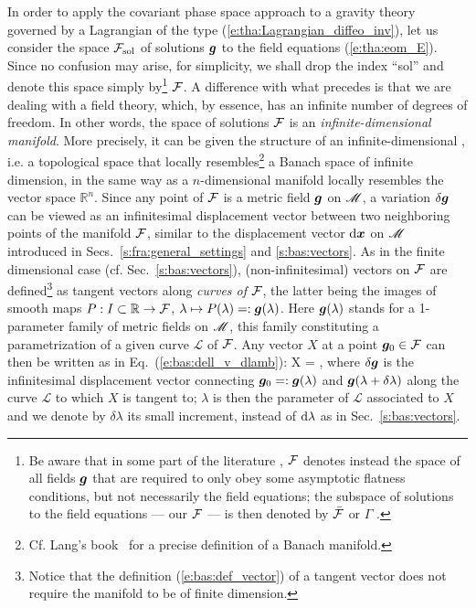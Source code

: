 In order to apply the covariant phase space approach to
a gravity theory governed by a Lagrangian of the type (\ref{e:tha:Lagrangian_diffeo_inv}),
let us consider the
space $\mathcal{F}_{\rm sol}$ of solutions $\bm{g}$ to the field equations
(\ref{e:tha:eom_E}). Since no confusion may arise, for simplicity,
we shall drop the index ``sol'' and denote this space simply by\footnote{Be aware that in
some part of the
literature \cite{AshteBR91,LeeW90,WaldZ00}, $\mathcal{F}$ denotes instead the space of all fields $\bm{g}$
that are required to only obey some asymptotic flatness conditions, but not necessarily the field equations;
the subspace of solutions to the field equations --- our $\mathcal{F}$ --- is then denoted
by $\bar{\mathcal{F}}$ \cite{LeeW90,WaldZ00} or $\Gamma$ \cite{AshteBR91}.} $\mathcal{F}$.
A difference with what precedes is that
we are dealing with a field theory, which, by essence, has
an infinite number of degrees of freedom. In other words,
the space of solutions $\mathcal{F}$ is
an \emph{infinite-dimensional manifold}. More precisely, it can be given the structure of an
infinite-dimensional 
\cite{LeeW90,HarloW20}, i.e. a topological space that locally resembles\footnote{Cf. Lang's book~\cite{Lang95} for a
precise definition of a Banach manifold.} a Banach space of infinite dimension, in the same
way as a $n$-dimensional manifold locally resembles the vector space $\mathbb{R}^n$.
Since any point of $\mathcal{F}$ is a metric field $\bm{g}$ on $\mathscr{M}$, a variation $\delta\bm{g}$
can be viewed as an infinitesimal displacement vector between two neighboring points of the manifold
$\mathcal{F}$, similar to the displacement vector $\mathrm{d}\bm{x}$ on $\mathscr{M}$ introduced in Secs.~\ref{s:fra:general_settings} and \ref{s:bas:vectors}.
As in the finite dimensional case
(cf. Sec.~\ref{s:bas:vectors}), (non-infinitesimal) vectors on $\mathcal{F}$
are defined\footnote{Notice that the definition (\ref{e:bas:def_vector}) of a tangent vector
does not require the manifold to be of finite dimension.} as tangent vectors
along \emph{curves of} $\mathcal{F}$, the latter being the images of smooth maps
$P: I\subset \mathbb{R} \to  \mathcal{F}$, $\lambda\mapsto P(\lambda) =: \bm{g}(\lambda)$. Here
$\bm{g}(\lambda)$ stands for a 1-parameter family of metric fields
on $\mathscr{M}$, this family constituting a parametrization of a given curve $\mathcal{L}$ of $\mathcal{F}$.
Any vector $X$ at a point $\bm{g}_0 \in \mathcal{F}$ can then be written as in Eq.~(\ref{e:bas:dell_v_dlamb}):
\be \label{e:tha:X_dg/dlambda}
    X =  ,
\ee
where $\delta\bm{g}$ is the infinitesimal displacement vector connecting $\bm{g}_0 =: \bm{g}(\lambda)$
and $\bm{g}(\lambda+\delta\lambda)$ along the curve $\mathcal{L}$
to which $X$ is tangent to; $\lambda$ is then the parameter of $\mathcal{L}$ associated to $X$
and we denote by $\delta\lambda$ its small increment, instead of $\mathrm{d}\lambda$ as in Sec.~\ref{s:bas:vectors}.


